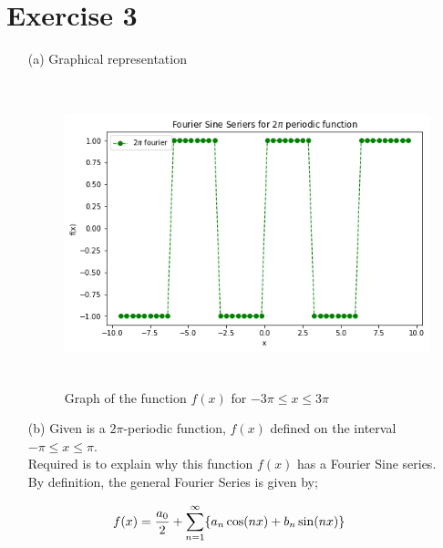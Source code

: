 \documentclass[12pt,a4paper]{article}
\begin{document}
\section*{Exercise 3}
\begin{enumerate}
    \item[(a)]  Graphical representation
            \begin{figure}[!h]
                \centering
                \includegraphics[width=350pt,height=250pt]{fourier.png}
                \caption{Graph of the function $f(x)$ for $-3\pi \leq x \leq 3 \pi$}
                \label{fig:my_label}
            \end{figure}
    \item[(b)]
        Given is a $2\pi$-periodic function, $f(x)$  defined on the interval $-\pi \leq x \leq \pi$.\\Required is to explain why this function $f(x)$ has a Fourier Sine series. \\
     By definition, the general Fourier Series is given by;

\begin{align}\label{eqt1}
f(x) &= \frac{a_0}{2} + \sum_{n=1}^{\infty} \{ a_n \cos (nx) + b_n \sin (nx)\} \hspace*{1cm} \\
\nonumber
\end{align}


\end{enumerate}
\end{document}
